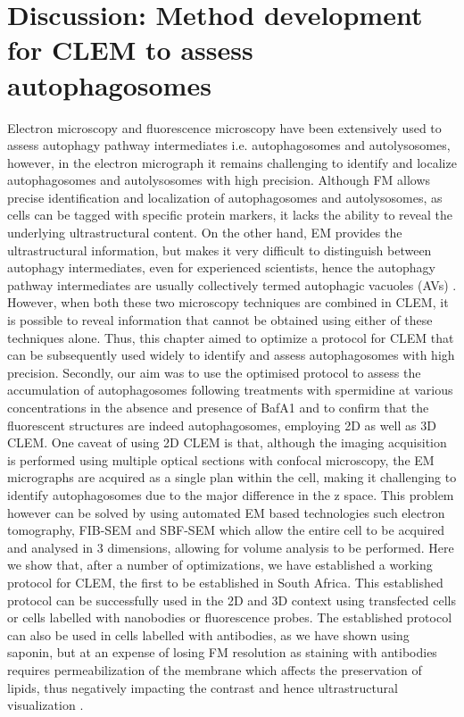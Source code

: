 \section{Discussion: Method development for CLEM to assess autophagosomes}
Electron microscopy and fluorescence microscopy have been extensively used to assess autophagy pathway intermediates i.e. autophagosomes and autolysosomes, however, in the electron micrograph it remains challenging to identify and localize autophagosomes and autolysosomes with high precision. Although FM allows precise identification and localization of autophagosomes and autolysosomes, as cells can be tagged with specific protein markers, it lacks the ability to reveal the underlying ultrastructural content. On the other hand, EM provides the ultrastructural information, but makes it very difficult to distinguish between autophagy intermediates, even for experienced scientists, hence the autophagy pathway intermediates are usually collectively termed autophagic vacuoles (AVs) \citep{Eskelinen2008,klionsky2016}. However, when both these two microscopy techniques are combined in CLEM, it is possible to reveal information that cannot be obtained using either of these techniques alone. Thus, this chapter aimed to optimize a protocol for CLEM that can be subsequently used widely to identify and assess autophagosomes with high precision. Secondly, our aim was to use the optimised protocol to assess the accumulation of autophagosomes following treatments with spermidine at various concentrations in the absence and presence of BafA1 and to confirm that the fluorescent structures are indeed autophagosomes, employing 2D as well as 3D CLEM. One caveat of using 2D CLEM is that, although the imaging acquisition is performed using multiple optical sections with confocal microscopy, the EM micrographs are acquired as a single plan within the cell, making it challenging to identify autophagosomes due to the major difference in the z space. This problem however can be solved by using automated EM based technologies such electron tomography, FIB-SEM and SBF-SEM \citep{Burel2018,Duke2014,Russell2017,Yla-Anttila2009} which allow the entire cell to be acquired and analysed in 3 dimensions, allowing for volume analysis to be performed. Here we show that, after a number of optimizations, we have established a working protocol for CLEM, the first to be established in South Africa. This established protocol can be successfully used in the 2D and 3D context using transfected cells or cells labelled with nanobodies or fluorescence probes. The established protocol can also be used in cells labelled with antibodies, as we have shown using saponin, but at an expense of losing FM resolution as staining with antibodies requires permeabilization of the membrane which affects the preservation of lipids, thus negatively impacting the contrast and hence ultrastructural visualization \citep{Eskelinen2008}.

